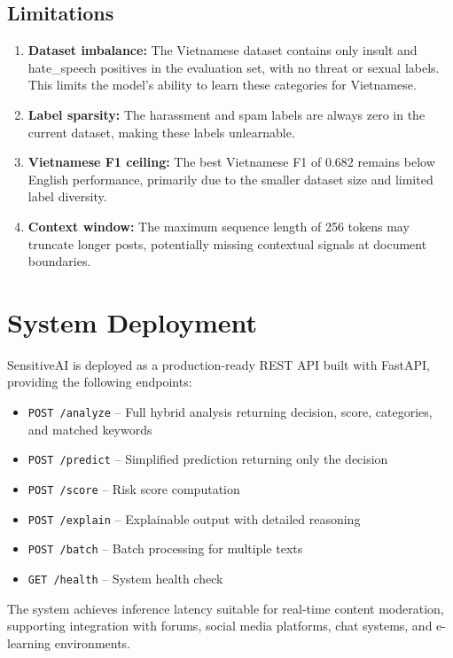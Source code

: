 \documentclass[12pt,a4paper]{article}
\begin{document}
\subsection{Limitations}

\begin{enumerate}[leftmargin=*]
    \item \textbf{Dataset imbalance:} The Vietnamese dataset contains only insult and hate\_speech positives in the evaluation set, with no threat or sexual labels. This limits the model's ability to learn these categories for Vietnamese.
    \item \textbf{Label sparsity:} The harassment and spam labels are always zero in the current dataset, making these labels unlearnable.
    \item \textbf{Vietnamese F1 ceiling:} The best Vietnamese F1 of 0.682 remains below English performance, primarily due to the smaller dataset size and limited label diversity.
    \item \textbf{Context window:} The maximum sequence length of 256 tokens may truncate longer posts, potentially missing contextual signals at document boundaries.
\end{enumerate}

\section{System Deployment}
\label{sec:deployment}

SensitiveAI is deployed as a production-ready REST API built with FastAPI, providing the following endpoints:

\begin{itemize}[leftmargin=*]
    \item \texttt{POST /analyze} -- Full hybrid analysis returning decision, score, categories, and matched keywords
    \item \texttt{POST /predict} -- Simplified prediction returning only the decision
    \item \texttt{POST /score} -- Risk score computation
    \item \texttt{POST /explain} -- Explainable output with detailed reasoning
    \item \texttt{POST /batch} -- Batch processing for multiple texts
    \item \texttt{GET /health} -- System health check
\end{itemize}

The system achieves inference latency suitable for real-time content moderation, supporting integration with forums, social media platforms, chat systems, and e-learning environments.
\end{document}

